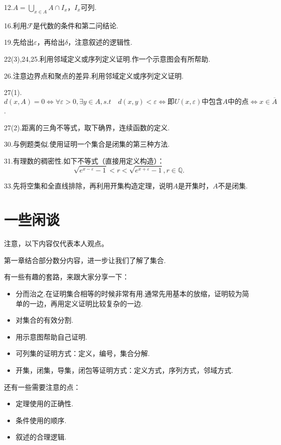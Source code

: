 \documentclass[bwprint, withoutpreface]{cumcmthesis}
\begin{document}
12.$A = \bigcup_{x \in A}{A \cap I_x}$，$I_x$可列.

16.利用$\mathcal{F}$是代数的条件和第二问结论.

19.先给出$\varepsilon$，再给出$\delta$，注意叙述的逻辑性.

22(3),24,25.利用邻域定义或序列定义证明.作一个示意图会有所帮助.

26.注意边界点和聚点的差异.利用邻域定义或序列定义证明.

27(1).$d(x, A) = 0 \iff \forall \varepsilon > 0, \exists y \in A, s.t \quad d(x, y) < \varepsilon \iff \mbox{即$U(x, \varepsilon)$中包含$A$中的点} \iff x \in \overline{A}$.

27(2).距离的三角不等式，取下确界，连续函数的定义.

30.与例题类似.使用证明一个集合是闭集的第三种方法.

31.有理数的稠密性.如下不等式（直接用定义构造）：
\begin{equation*}
	\sqrt{e^{x - \varepsilon} - 1} < r < \sqrt{e^{x + \varepsilon} - 1}, r \in \mathbb{Q}.
\end{equation*}

33.先将空集和全直线排除，再利用开集构造定理，说明$A$是开集时，$A$不是闭集.

\section{一些闲谈}
\indent 注意，以下内容仅代表本人观点。

第一章结合部分数分内容，进一步让我们了解了集合.

有一些有趣的套路，来跟大家分享一下：
\begin{itemize}[itemindent=2em]
	\item 分而治之.在证明集合相等的时候非常有用.通常先用基本的放缩，证明较为简单的一边，再用定义证明比较复杂的一边.
	\item 对集合的有效分割.
	\item 用示意图帮助自己证明.
	\item 可列集的证明方式：定义，编号，集合分解.
	\item 开集，闭集，导集，闭包等证明方式：定义方式，序列方式，邻域方式.
\end{itemize}

还有一些需要注意的点：
\begin{itemize}[itemindent=2em]
	\item 定理使用的正确性.
	\item 条件使用的顺序.
	\item 叙述的合理逻辑.
\end{itemize}
\end{document}
